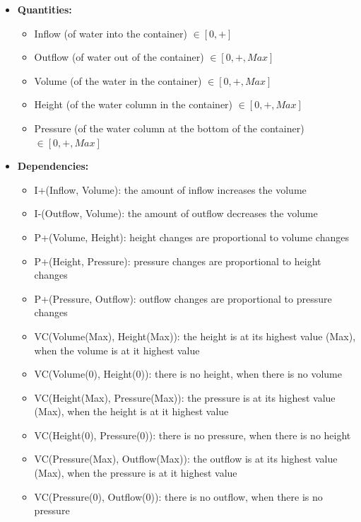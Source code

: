 \documentclass[a4paper]{article}
\begin{document}
\begin{itemize}
\item \textbf{Quantities:}
\begin{itemize}
\item Inflow (of water into the container) $\in [0, +]$
\item Outflow (of water out of the container) $\in [0, +, Max]$
\item Volume (of the water in the container) $\in [0, +, Max]$
\item Height (of the water column in the container) $\in [0, +, Max]$
\item Pressure (of the water column at the bottom of the container) $\in [0, +, Max]$
\end{itemize}

\item \textbf{Dependencies:}
\begin{itemize}
\item I+(Inflow, Volume): the amount of inflow increases the volume
\item I-(Outflow, Volume): the amount of outflow decreases the volume
\item P+(Volume, Height): height changes are proportional to volume changes
\item P+(Height, Pressure): pressure changes are proportional to height changes
\item P+(Pressure, Outflow): outflow changes are proportional to pressure changes
\item VC(Volume(Max), Height(Max)): the height is at its highest value (Max), when the volume is at it highest value
\item VC(Volume(0), Height(0)): there is no height, when there is no volume
\item VC(Height(Max), Pressure(Max)): the pressure is at its highest value (Max), when the height is at it highest value
\item VC(Height(0), Pressure(0)): there is no pressure, when there is no height
\item VC(Pressure(Max), Outflow(Max)): the outflow is at its highest value (Max), when the pressure is at it highest value
\item VC(Pressure(0), Outflow(0)): there is no outflow, when there is no pressure
\end{itemize}
\end{itemize}
\end{document}
